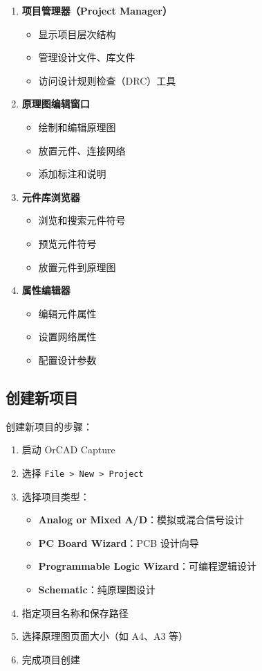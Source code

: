 \begin{enumerate}
  \item \textbf{项目管理器（Project Manager）}
    \begin{itemize}
      \item 显示项目层次结构
      \item 管理设计文件、库文件
      \item 访问设计规则检查（DRC）工具
    \end{itemize}

  \item \textbf{原理图编辑窗口}
    \begin{itemize}
      \item 绘制和编辑原理图
      \item 放置元件、连接网络
      \item 添加标注和说明
    \end{itemize}

  \item \textbf{元件库浏览器}
    \begin{itemize}
      \item 浏览和搜索元件符号
      \item 预览元件符号
      \item 放置元件到原理图
    \end{itemize}

  \item \textbf{属性编辑器}
    \begin{itemize}
      \item 编辑元件属性
      \item 设置网络属性
      \item 配置设计参数
    \end{itemize}
\end{enumerate}

\subsection{创建新项目}


创建新项目的步骤：

\begin{enumerate}
  \item 启动 OrCAD Capture
  \item 选择 \lstinline{File > New > Project}
  \item 选择项目类型：
    \begin{itemize}
      \item \textbf{Analog or Mixed A/D}：模拟或混合信号设计
      \item \textbf{PC Board Wizard}：PCB 设计向导
      \item \textbf{Programmable Logic Wizard}：可编程逻辑设计
      \item \textbf{Schematic}：纯原理图设计
    \end{itemize}
  \item 指定项目名称和保存路径
  \item 选择原理图页面大小（如 A4、A3 等）
  \item 完成项目创建
\end{enumerate}


